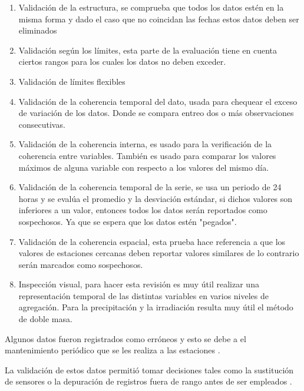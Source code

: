 \begin{enumerate}
\item Validación de la estructura, se comprueba que todos los datos estén en la misma forma y dado el caso que no coincidan las fechas estos datos deben ser eliminados

\item Validación según los límites, esta parte de la evaluación tiene en cuenta ciertos rangos para los cuales los datos no deben exceder.

\item Validación de límites flexibles

\item Validación de la coherencia temporal del dato, usada para chequear el exceso de variación de los datos. Donde se compara entreo dos o más observaciones consecutivas.

\item Validación de la coherencia interna, es usado para la verificación de la coherencia entre variables. También es usado para comparar los valores máximos de alguna variable con respecto a los valores del mismo día.

\item Validación de la coherencia temporal de la serie, se usa un periodo de 24 horas y se evalúa el promedio y la desviación estándar, si dichos valores son inferiores a un valor, entonces todos los datos serán reportados como sospechosos. Ya que se espera que los datos estén "pegados".

\item Validación de la coherencia espacial, esta prueba hace referencia a que los valores de estaciones cercanas deben reportar valores similares de lo contrario serán marcados como sospechosos.

\item Inspección visual, para hacer esta revisión es muy útil realizar una representación temporal de las distintas variables en varios niveles de agregación. Para la precipitación y la irradiación resulta muy útil el método de doble masa.

\end{enumerate}

Algunos datos fueron registrados como erróneos y esto se debe a el mantenimiento periódico que se les realiza a las estaciones \citep{Estevez2008}.

La validación de estos datos permitió tomar decisiones tales como la sustitución de sensores o la depuración de registros fuera de rango antes de ser empleados \citep{Estevez2008}.

